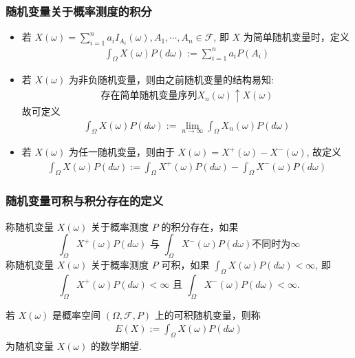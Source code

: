 \documentclass[Prob-All.tex]{subfiles}
\begin{document}
	\begin{frame}
		\frametitle{随机变量关于概率测度的积分}
		\begin{itemize}[<+-|alert@+>]
			\item 若 $X (\omega)=\sum_{i=1}^{n} a_{i} I_{A_{i}}(\omega), A_1,\cdots, A_n\in\mathcal{F}$, 即 $X$ 为简单随机变量时，定义 \pause
			\begin{eqnarray*}
				\int_\Omega X(\omega)P(d\omega):=\sum_{i=1}^na_iP(A_i)
			\end{eqnarray*}
			\item 若 $X (\omega)$ 为非负随机变量，则由之前随机变量的结构易知:\pause
			\begin{eqnarray*}
				\mbox{存在简单随机变量序列} X_n (\omega)\uparrow X (\omega)
			\end{eqnarray*}
			故可定义 \pause
			\begin{eqnarray*}
				\int_\Omega X(\omega)P(d\omega):=\lim_{n\rightarrow\infty}\int_\Omega X_n(\omega)P(d\omega)
			\end{eqnarray*}
			\item 若 $X (\omega)$ 为任一随机变量，则由于 $X (\omega)=X^+(\omega)-X^-(\omega)$, 故定义 \pause
			\begin{eqnarray*}
				\int_\Omega X(\omega)P(d\omega):=\int_\Omega X^+(\omega)P(d\omega)-\int_\Omega X^-(\omega)P(d\omega)
			\end{eqnarray*}

		\end{itemize}
	\end{frame}
	\begin{frame}
		\frametitle{随机变量可积与积分存在的定义}
		\begin{defi}
			称随机变量 $X (\omega)$ 关于概率测度 $P$ 的积分存在，如果 \pause
			\[\int_\Omega X^+(\omega) P (d\omega) \mbox{ 与 }\int_\Omega X^-(\omega) P (d\omega) \mbox{不同时为}\infty\]                                                  \pause  称随机变量 $X (\omega)$ 关于概率测度 $P$ 可积，如果 \pause $\int_\Omega X (\omega) P (d\omega)<\infty$, 即 \pause
			\[\int_\Omega X^+(\omega) P (d\omega)<\infty \mbox{ 且 }\int_\Omega X^-(\omega) P (d\omega)<\infty.\]                                                         \end{defi}
		\pause
		\begin{defi}
			若 $X (\omega)$ 是概率空间 $(\Omega,\mathcal{F},P)$ 上的可积随机变量，则称
			\begin{eqnarray*}
				E(X):=\int_\Omega X(\omega)P(d\omega)
			\end{eqnarray*}
			为随机变量 $X (\omega)$ 的数学期望.
		\end{defi}
	\end{frame}
\end{document}
